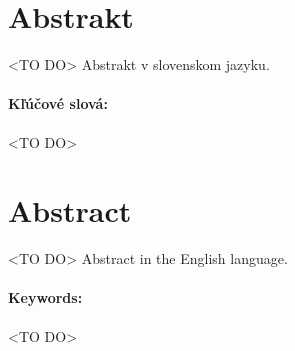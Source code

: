 \documentclass[12pt, twoside]{book}
\begin{document}
\newpage 
\section*{Abstrakt}

<TO DO> Abstrakt v slovenskom jazyku.

\paragraph*{Kľúčové slová:} <TO DO>


\newpage 
\section*{Abstract}

<TO DO> Abstract in the English language.


\paragraph*{Keywords:} <TO DO>


%
%
%


\newpage 

\tableofcontents


\newpage 

\listoffigures
\listoftables


\mainmatter
\pagestyle{headings}


 


\end{document}
